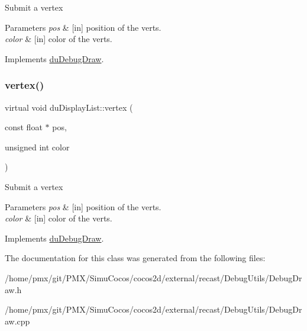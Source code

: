 Submit a vertex 
\begin{DoxyParams}{Parameters}
{\em pos} & \mbox{[}in\mbox{]} position of the verts. \\
\hline
{\em color} & \mbox{[}in\mbox{]} color of the verts. \\
\hline
\end{DoxyParams}


Implements \hyperlink{structduDebugDraw_a8fac1072846b60be4ce4810c68140ee8}{du\+Debug\+Draw}.

\mbox{\label{classduDisplayList_a5560d17b5190f75733154af2610ed83f}} 
\subsubsection{\texorpdfstring{vertex()}{vertex()}\hspace{0.1cm}{\footnotesize\ttfamily [4/4]}}
{\footnotesize\ttfamily virtual void du\+Display\+List\+::vertex (\begin{DoxyParamCaption}\item[{const float $\ast$}]{pos,  }\item[{unsigned int}]{color }\end{DoxyParamCaption})\hspace{0.3cm}{\ttfamily [virtual]}}

Submit a vertex 
\begin{DoxyParams}{Parameters}
{\em pos} & \mbox{[}in\mbox{]} position of the verts. \\
\hline
{\em color} & \mbox{[}in\mbox{]} color of the verts. \\
\hline
\end{DoxyParams}


Implements \hyperlink{structduDebugDraw_a8fac1072846b60be4ce4810c68140ee8}{du\+Debug\+Draw}.



The documentation for this class was generated from the following files\+:\begin{DoxyCompactItemize}
\item 
/home/pmx/git/\+P\+M\+X/\+Simu\+Cocos/cocos2d/external/recast/\+Debug\+Utils/Debug\+Draw.\+h\item 
/home/pmx/git/\+P\+M\+X/\+Simu\+Cocos/cocos2d/external/recast/\+Debug\+Utils/Debug\+Draw.\+cpp\end{DoxyCompactItemize}
